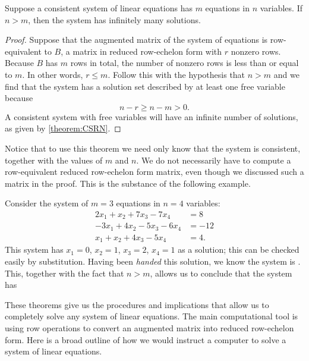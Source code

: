\documentclass{ximera}
\begin{document}
\begin{theorem}
\label{theorem:CMVEI}

Suppose a consistent system of linear equations has $m$ equations in $n$ variables.  If $n>m$, then the system has infinitely many solutions.

\begin{proof}
Suppose that the augmented matrix of the system of equations is row-equivalent to $B$, a matrix in reduced row-echelon form with $r$ nonzero rows.
Because $B$ has $m$ rows in total, the number of nonzero rows is less than or equal to $m$.  In other words, $r\leq m$.
Follow this with the hypothesis that $n>m$ and we find that the system has a solution set described by at least one free variable because
\[
n-r\geq n-m>0.
\]
A consistent system with free variables will have an infinite number of solutions, as given by \ref{theorem:CSRN}.
\end{proof}
\end{theorem}

Notice that to use this theorem we need only know that the system is consistent, together with the values of $m$ and $n$.  We do not necessarily have to compute a row-equivalent reduced row-echelon form matrix, even though we discussed such a matrix in the proof.  This is the substance of the following example.

\begin{example}
Consider the system of $m=3$ equations in $n=4$ variables:
\begin{align*}
2x_1  + x_2 + 7x_3 - 7x_4 &= 8 \\
-3x_1 + 4x_2 -5x_3 - 6x_4 &=  -12 \\
x_1 +x_2 + 4x_3 - 5x_4 &=  4.
\end{align*}
This system has $x_1 = 0$, $x_2 = 1$, $x_3 = 2$, $x_4 = 1$ as a
solution; this can be checked easily by substitution.  Having been
\textit{handed} this solution, we know the system is
.  This,
together with the fact that $n>m$, allows us to conclude that the
system has
\begin{multipleChoice}
\end{multipleChoice}
\end{example}

These theorems give us the procedures and implications that allow us to completely solve any system of linear equations.  The main computational tool is using row operations to convert an augmented matrix into reduced row-echelon form.  Here is a broad outline of how we would instruct a computer to solve a system of linear equations.
\end{document}
